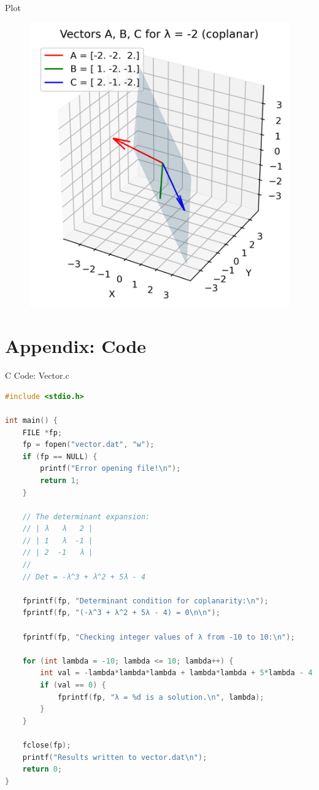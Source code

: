 \documentclass{beamer}
\numberwithin{equation}{section}
\theoremstyle{remark}
\begin{document}
\begin{frame}{Plot}
    \begin{figure}[H]
    \centering
    \includegraphics[width=0.66\columnwidth]{figs/01.png}
    \label{fig-1}
\end{figure}
\end{frame}

\section*{Appendix: Code}

\begin{frame}[fragile]{C Code: Vector.c}
\begin{lstlisting}[language=C]
#include <stdio.h>

int main() {
    FILE *fp;
    fp = fopen("vector.dat", "w");
    if (fp == NULL) {
        printf("Error opening file!\n");
        return 1;
    }

    // The determinant expansion:
    // | λ   λ   2 |
    // | 1   λ  -1 |
    // | 2  -1   λ |
    //
    // Det = -λ^3 + λ^2 + 5λ - 4

    fprintf(fp, "Determinant condition for coplanarity:\n");
    fprintf(fp, "(-λ^3 + λ^2 + 5λ - 4) = 0\n\n");

    fprintf(fp, "Checking integer values of λ from -10 to 10:\n");

    for (int lambda = -10; lambda <= 10; lambda++) {
        int val = -lambda*lambda*lambda + lambda*lambda + 5*lambda - 4;
        if (val == 0) {
            fprintf(fp, "λ = %d is a solution.\n", lambda);
        }
    }

    fclose(fp);
    printf("Results written to vector.dat\n");
    return 0;
}

    \end{lstlisting}
\end{frame}
\end{document}
